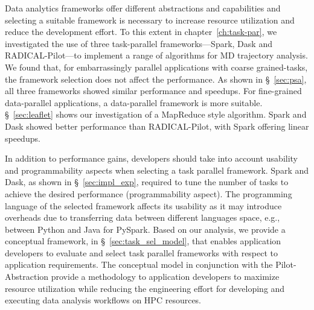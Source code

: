 Data analytics frameworks offer different abstractions and capabilities and 
selecting a suitable framework is necessary to increase resource utilization 
and reduce the development effort.
To this extent in chapter~\ref{ch:task-par}, we investigated the use of three 
task-parallel frameworks---Spark, Dask and RADICAL-Pilot---to implement a range 
of algorithms for MD trajectory analysis. We found that, for embarrassingly 
parallel applications with coarse  grained-tasks, the framework selection does 
not affect the performance. As shown in \S~\ref{sec:psa}, all three frameworks 
showed similar performance and speedups. For fine-grained data-parallel 
applications, a  data-parallel framework is more suitable. \S~\ref{sec:leaflet} 
shows our investigation of a MapReduce style algorithm. Spark and Dask showed 
better performance than RADICAL-Pilot, with Spark offering linear speedups.

In addition to performance gains, developers should take into account usability 
and programmability aspects when selecting a task parallel framework. Spark and 
Dask, as shown in \S~\ref{sec:impl_exp}, required to tune the number of tasks 
to achieve the desired performance (programmability aspect). The programming 
language of the selected framework affects its usability as it may introduce 
overheads due to transferring data between different languages space, e.g., 
between Python and Java for PySpark. Based on our analysis, we provide a 
conceptual framework, in \S~\ref{sec:task_sel_model}, that enables application 
developers to evaluate and select task parallel frameworks with respect to 
application requirements. The conceptual model in conjunction with 
the Pilot-Abstraction provide a methodology to application developers to 
maximize resource utilization while reducing the engineering effort for 
developing and executing data analysis workflows on HPC resources.

